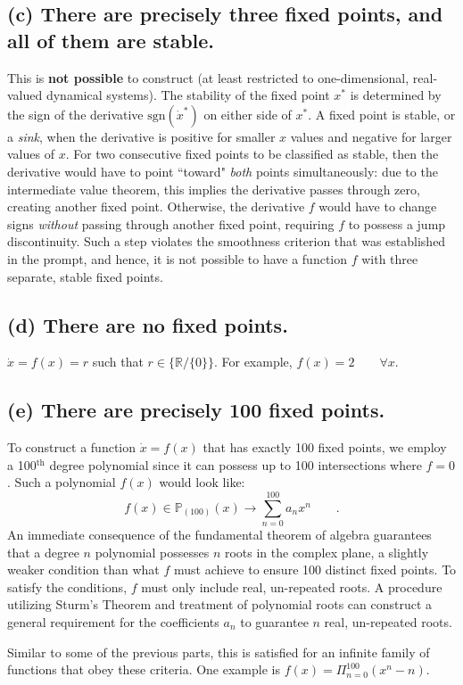 \documentclass[draft]{agujournal2019}
\begin{document}
\subsection{(c) There are precisely three fixed points, and all of them are stable.}
\label{subsec:p2c}
This is \textbf{not possible} to construct (at least restricted to one-dimensional, real-valued dynamical systems). The stability of the fixed point $x^*$ is determined by the sign of the derivative $\textrm{sgn}({\dot x^*})$ on either side of $x^*$. A fixed point is stable, or a \emph{sink}, when the derivative is positive for smaller $x$ values and negative for larger values of $x$. For two consecutive fixed points to be classified as stable, then the derivative would have to point ``toward" \emph{both} points simultaneously: due to the intermediate value theorem, this implies the derivative passes through zero, creating another fixed point. Otherwise, the derivative $f$ would have to change signs \emph{without} passing through another fixed point, requiring $f$ to possess a jump discontinuity. Such a step violates the smoothness criterion that was established in the prompt, and hence, it is not possible to have a function $f$ with three separate, stable fixed points. 


\subsection{(d) There are no fixed points.}
\label{subsec:p2d}
$\dot x = f(x) = r$ such that $r \in \{\mathbb{R}/\{0\}\}$. For example, $f(x) = 2 \qquad \forall x$.


\subsection{(e) There are precisely 100 fixed points.}
\label{subsec:p2e}

To construct a function $\dot x = f(x)$ that has exactly 100 fixed points, we employ a 100$^\mathrm{th}$ degree polynomial since it can possess up to 100 intersections where $f=0$. Such a polynomial $f(x)$ would look like:
\begin{equation*}
    f(x) \in \mathbb{P}_{(100)}(x) \longrightarrow \sum_{n=0}^{100} a_n x^n \qquad .
\end{equation*}
An immediate consequence of the fundamental theorem of algebra guarantees that a degree $n$ polynomial possesses $n$ roots in the complex plane, a slightly weaker condition than what $f$ must achieve to ensure 100 distinct fixed points. To satisfy the conditions, $f$ must only include real, un-repeated roots. A procedure utilizing Sturm's Theorem and treatment of polynomial roots can construct a general requirement for the coefficients $a_n$ to guarantee $n$ real, un-repeated roots. 
\par
Similar to some of the previous parts, this is satisfied for an infinite family of functions that obey these criteria. One example is ${f(x) = \Pi_{n=0}^{100} (x^n - n)}$. 
\end{document}
